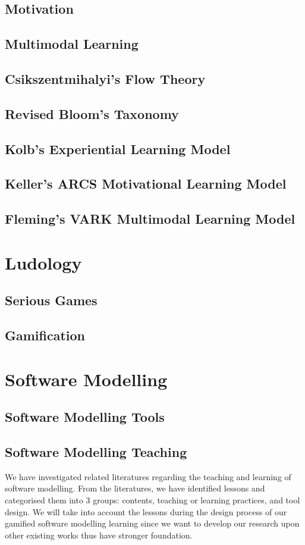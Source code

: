 \documentclass[a4paper]{Report}
\begin{document}
\subsection{Motivation}
\subsection{Multimodal Learning}
\subsection{Csikszentmihalyi’s Flow Theory}
\subsection{Revised Bloom’s Taxonomy}
\subsection{Kolb’s Experiential Learning Model}
\subsection{Keller’s ARCS Motivational Learning Model}
\subsection{Fleming’s VARK Multimodal Learning Model}
\section{Ludology}
\subsection{Serious Games}
\subsection{Gamification}
\section{Software Modelling}

\subsection{Software Modelling Tools}

\subsection{Software Modelling Teaching}
We have investigated related literatures regarding the teaching and learning of software modelling.  From the literatures, we have identified lessons and categorised them into 3 groups: contents, teaching or learning practices, and tool design. We will take into account the lessons during the design process of our gamified software modelling learning since we want to develop our research upon other existing works thus have stronger foundation.   
\end{document}
